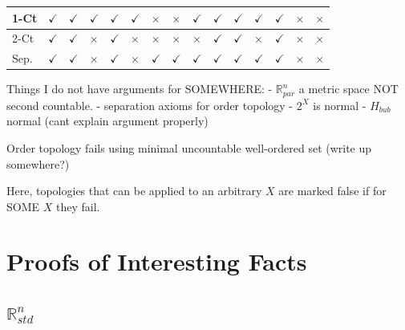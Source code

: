 \documentclass[12pt,letterpaper,reqno]{article}
\begin{document}
\begin{center}
\begin{table}[htp!]
\begin{tabular}{|l|l|l|l|l|l|l|l|l|l|l|l|l|l|l|}
1-Ct & $\checkmark$       & $\checkmark$                                                                   & $\checkmark$           & $\checkmark$ & $\checkmark$ & $\times$     & $\times$      & $\checkmark$      & $\checkmark$      & $\checkmark$       & $\checkmark$ & $\checkmark$         & $\times$     & $\times$     \\ \hline
2-Ct & $\checkmark$       & \hyperref[property:rn-std-second-countable]{$\checkmark$} & $\times$               & $\checkmark$ & $\times$     & $\times$     & $\times$      & $\times$          & $\checkmark$      & $\checkmark$       & $\times$     & $\checkmark$         & $\times$     & $\times$     \\ \hline
Sep.    & $\checkmark$       & $\checkmark$                                                                   & $\times$               & $\checkmark$ & $\times$     & $\checkmark$ & $\checkmark$  & $\checkmark$      & $\checkmark$      & $\checkmark$       & $\checkmark$ & $\checkmark$         & $\times$     & $\times$     \\ \cline{15-15} 
\end{tabular}
\end{table}
\end{center}

Things I do not have arguments for SOMEWHERE:
- $\mathbb{R}^{n}_{par}$ a metric space NOT second countable.
- separation axioms for order topology
- $2^{X}$ is normal 
- $H_{bub}$ normal (cant explain argument properly)

Order topology fails using minimal uncountable well-ordered set (write up somewhere?)

Here, topologies that can be applied to an arbitrary $X$ are marked false if for SOME $X$ they fail.

\newpage 
\section{Proofs of Interesting Facts}

\subsection{$\mathbb{R}_{std}^n$}

\begin{theorem}\label{property:rn-metrizable}
    
\end{theorem}

\begin{theorem}\label{property:rn-first-countable}
    
\end{theorem}
\end{document}
